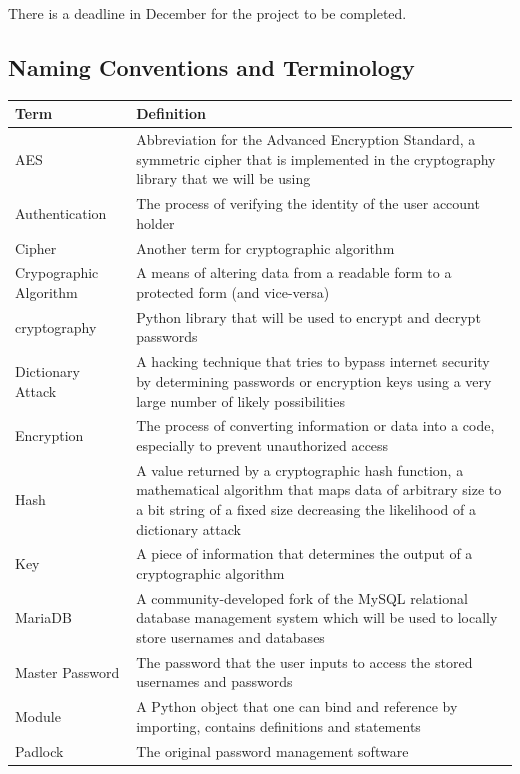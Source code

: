 \documentclass[12pt, titlepage]{article}
\begin{document}
There is a deadline in December for the project to be completed.

\subsection{Naming Conventions and Terminology}
\begin{table}[H]
\centering
{}
\begin{tabular}{ | p{3cm} | p{10cm} | }
	\hline
	Term & Definition \\
	\hline
	AES & Abbreviation for the Advanced Encryption Standard, a symmetric cipher that is implemented in the cryptography library that we will be using \\
	\hline
	Authentication & The process of verifying the identity of the user account holder  \\
	\hline
	Cipher & Another term for cryptographic algorithm \\
	\hline
	Crypographic Algorithm & A means of altering data from a readable form to a protected form (and vice-versa) \\
	\hline
	cryptography & Python library that will be used to encrypt and decrypt passwords \\
	\hline
	Dictionary Attack & A hacking technique that tries to bypass internet security by determining passwords or encryption keys using a very large number of likely possibilities \\
	\hline
	Encryption & The process of converting information or data into a code, especially to prevent unauthorized access \\
	\hline
	Hash & A value returned by a cryptographic hash function, a mathematical algorithm that maps data of arbitrary size to a bit string of a fixed size decreasing the likelihood of a dictionary attack \\
	\hline
	Key & A piece of information that determines the output of a cryptographic algorithm \\
	\hline
	MariaDB & A community-developed fork of the MySQL relational database management system which will be used to locally store usernames and databases \\
	\hline
	Master Password & The password that the user inputs to access the stored usernames and passwords \\
	\hline
	Module & A Python object that one can bind and reference by importing, contains definitions and statements \\
	\hline
	Padlock & The original password management software \\

\end{tabular}
\end{table}
\end{document}
